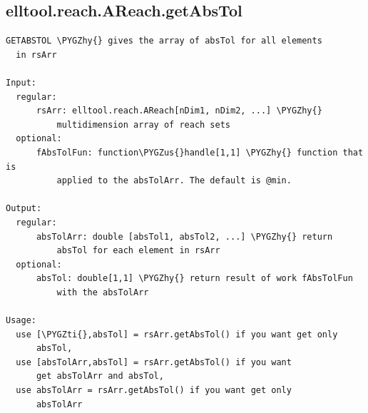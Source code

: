 \documentclass[letterpaper,10pt,english]{sphinxmanual}
\def\PYGZus{\char`\_}
\def\PYGZhy{\char`\-}
\def\PYGZti{\char`\~}
\begin{document}
\subsection{elltool.reach.AReach.getAbsTol}
\label{chap_functions:elltool-reach-areach-getabstol}
\begin{Verbatim}[commandchars=\\\{\}]
GETABSTOL \PYGZhy{} gives the array of absTol for all elements
  in rsArr

Input:
  regular:
      rsArr: elltool.reach.AReach[nDim1, nDim2, ...] \PYGZhy{}
          multidimension array of reach sets
  optional:
      fAbsTolFun: function\PYGZus{}handle[1,1] \PYGZhy{} function that is
          applied to the absTolArr. The default is @min.

Output:
  regular:
      absTolArr: double [absTol1, absTol2, ...] \PYGZhy{} return
          absTol for each element in rsArr
  optional:
      absTol: double[1,1] \PYGZhy{} return result of work fAbsTolFun
          with the absTolArr

Usage:
  use [\PYGZti{},absTol] = rsArr.getAbsTol() if you want get only
      absTol,
  use [absTolArr,absTol] = rsArr.getAbsTol() if you want
      get absTolArr and absTol,
  use absTolArr = rsArr.getAbsTol() if you want get only
      absTolArr
\end{Verbatim}
\end{document}
